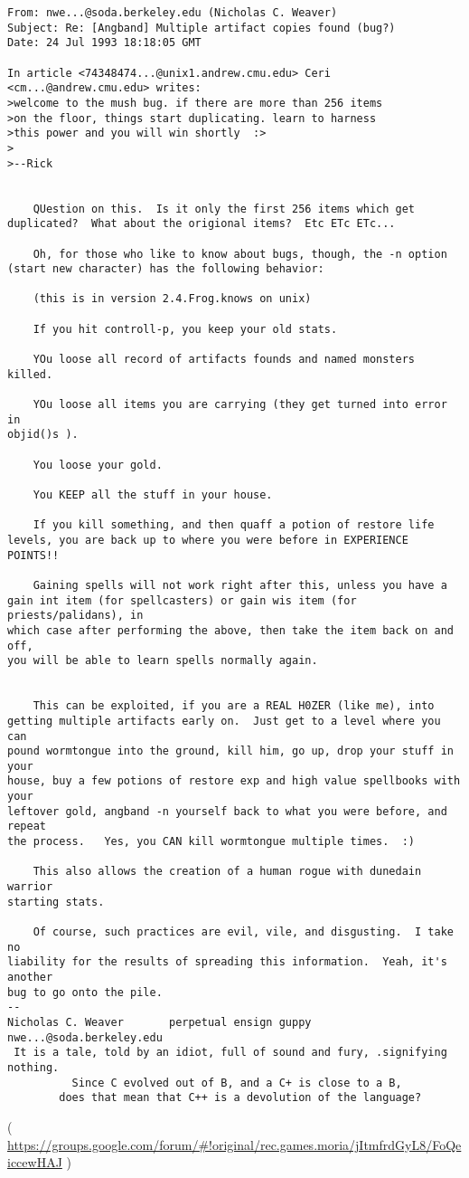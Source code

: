 \begin{lstlisting}
From: nwe...@soda.berkeley.edu (Nicholas C. Weaver)
Subject: Re: [Angband] Multiple artifact copies found (bug?)
Date: 24 Jul 1993 18:18:05 GMT

In article <74348474...@unix1.andrew.cmu.edu> Ceri <cm...@andrew.cmu.edu> writes:
>welcome to the mush bug. if there are more than 256 items
>on the floor, things start duplicating. learn to harness
>this power and you will win shortly  :>
>
>--Rick


	QUestion on this.  Is it only the first 256 items which get
duplicated?  What about the origional items?  Etc ETc ETc...

	Oh, for those who like to know about bugs, though, the -n option
(start new character) has the following behavior:

	(this is in version 2.4.Frog.knows on unix)

	If you hit controll-p, you keep your old stats.

	YOu loose all record of artifacts founds and named monsters killed.

	YOu loose all items you are carrying (they get turned into error in
objid()s ).

	You loose your gold.

	You KEEP all the stuff in your house.

	If you kill something, and then quaff a potion of restore life
levels, you are back up to where you were before in EXPERIENCE POINTS!!

	Gaining spells will not work right after this, unless you have a
gain int item (for spellcasters) or gain wis item (for priests/palidans), in
which case after performing the above, then take the item back on and off,
you will be able to learn spells normally again.


	This can be exploited, if you are a REAL H0ZER (like me), into
getting multiple artifacts early on.  Just get to a level where you can
pound wormtongue into the ground, kill him, go up, drop your stuff in your
house, buy a few potions of restore exp and high value spellbooks with your
leftover gold, angband -n yourself back to what you were before, and repeat
the process.   Yes, you CAN kill wormtongue multiple times.  :)

	This also allows the creation of a human rogue with dunedain warrior
starting stats.

	Of course, such practices are evil, vile, and disgusting.  I take no
liability for the results of spreading this information.  Yeah, it's another
bug to go onto the pile.
-- 
Nicholas C. Weaver       perpetual ensign guppy      nwe...@soda.berkeley.edu
 It is a tale, told by an idiot, full of sound and fury, .signifying nothing.
          Since C evolved out of B, and a C+ is close to a B,
        does that mean that C++ is a devolution of the language?
\end{lstlisting}
( \url{https://groups.google.com/forum/#!original/rec.games.moria/jItmfrdGyL8/FoQeiccewHAJ} )

